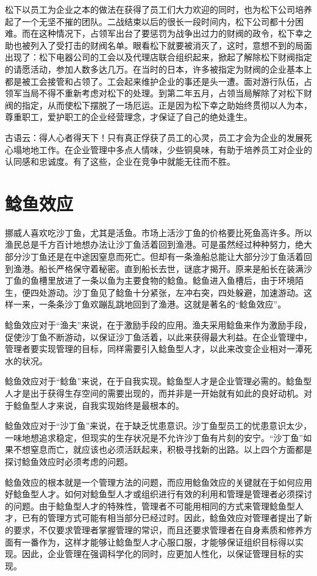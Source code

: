 \documentclass[11pt]{ctexart}
\begin{document}
松下以员工为企业之本的做法在获得了员工们大力欢迎的同时，也为松下公司培养起了一个无坚不摧的团队。二战结束以后的很长一段时间内，松下公司都十分困难。而在这种情况下，占领军出台了要惩罚为战争出过力的财阀的政令，松下幸之助也被列入了受打击的财阀名单。眼看松下就要被消灭了，这时，意想不到的局面出现了：松下电器公司的工会以及代理店联合组织起来，掀起了解除松下财阀指定的请愿活动，参加人数多达几万。在当时的日本，许多被指定为财阀的企业基本上都是被工会接管和占领了。工会起来维护企业的事还是头一遭。面对游行队伍，占领军当局不得不重新考虑对松下的处理。到第二年五月，占领当局解除了对松下财阀的指定，从而使松下摆脱了一场厄运。正是因为松下幸之助始终贯彻以人为本，尊重职工，爱护职工的企业经营理念，才保证了自己的绝处逢生。

古语云：得人心者得天下！只有真正俘获了员工的心灵，员工才会为企业的发展死心塌地地工作。在企业管理中多点人情味，少些铜臭味，有助于培养员工对企业的认同感和忠诚度。有了这些，企业在竞争中就能无往而不胜。
\section{鲶鱼效应}
\label{sec-73}


挪威人喜欢吃沙丁鱼，尤其是活鱼。市场上活沙丁鱼的价格要比死鱼高许多。所以渔民总是千方百计地想办法让沙丁鱼活着回到渔港。可是虽然经过种种努力，绝大部分沙丁鱼还是在中途因窒息而死亡。但却有一条渔船总能让大部分沙丁鱼活着回到渔港。船长严格保守着秘密。直到船长去世，谜底才揭开。原来是船长在装满沙丁鱼的鱼槽里放进了一条以鱼为主要食物的鲶鱼。鲶鱼进入鱼槽后，由于环境陌生，便四处游动。沙丁鱼见了鲶鱼十分紧张，左冲右突，四处躲避，加速游动。这样一来，一条条沙丁鱼欢蹦乱跳地回到了渔港。这就是著名的“鲶鱼效应”。

鲶鱼效应对于“渔夫”来说，在于激励手段的应用。渔夫采用鲶鱼来作为激励手段，促使沙丁鱼不断游动，以保证沙丁鱼活着，以此来获得最大利益。在企业管理中，管理者要实现管理的目标，同样需要引入鲶鱼型人才，以此来改变企业相对一潭死水的状况。

鲶鱼效应对于“鲶鱼”来说，在于自我实现。鲶鱼型人才是企业管理必需的。鲶鱼型人才是出于获得生存空间的需要出现的，而并非是一开始就有如此的良好动机。对于鲶鱼型人才来说，自我实现始终是最根本的。

鲶鱼效应对于“沙丁鱼”来说，在于缺乏忧患意识。沙丁鱼型员工的忧患意识太少，一味地想追求稳定，但现实的生存状况是不允许沙丁鱼有片刻的安宁。“沙丁鱼”如果不想窒息而亡，就应该也必须活跃起来，积极寻找新的出路。以上四个方面都是探讨鲶鱼效应时必须考虑的问题。

鲶鱼效应的根本就是一个管理方法的问题，而应用鲶鱼效应的关键就在于如何应用好鲶鱼型人才。如何对鲶鱼型人才或组织进行有效的利用和管理是管理者必须探讨的问题。由于鲶鱼型人才的特殊性，管理者不可能用相同的方式来管理鲶鱼型人才，已有的管理方式可能有相当部分已经过时。因此，鲶鱼效应对管理者提出了新的要求，不仅要求管理者掌握管理的常识，而且还要求管理者在自身素质和修养方面有一番作为，这样才能够让鲶鱼型人才心服口服，才能够保证组织目标得以实现。因此，企业管理在强调科学化的同时，应更加人性化，以保证管理目标的实现。
\end{document}
